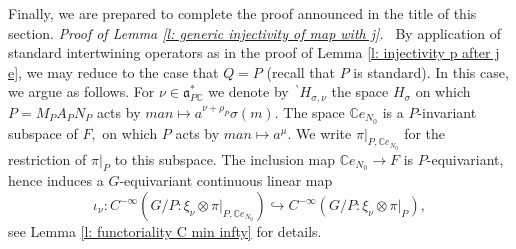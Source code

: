 \documentclass[12pt,a4paper]{article}
\def\medno{\medbreak\noindent}
\def\msy#1{{\mathbb #1}}
\def\C{{\msy C}}
\def\gs{\sigma}
\def\got#1{\mathfrak #1}
\def\fa{{\got a}}
\def\to{\rightarrow}
\def\iC{{\scriptscriptstyle \C}}
\numberwithin{Thm}{section}
\numberwithin{equation}{section}
\def\embeds{\hookrightarrow}
\def\faPdc{{\fa_{P\iC}^*}}
\numberwithin{equation}{section}
\def\bp{\!{\,}^\backprime}
\def\faPdc{\fa_{P\iC}^*}
\begin{document}
Finally, we are prepared to complete the proof announced in the title of this section.
\medno
{\em Proof of Lemma \ref{l: generic injectivity of map with j}.\ }
By application of standard intertwining operators as in the proof of Lemma \ref{l: injectivity p after j e},
 we may reduce to the case that $Q = P$ (recall that $P$ is standard). 
 In this case, we argue as follows. For $\nu \in \faPdc$ we 
 denote by  $\bp H_{\gs, \nu}$ the space $H_\gs$ on which $P=M_P A_PN_P$ acts by 
 $man \mapsto a^{\nu + \rho_P}\gs(m).$ The space $\C e_{N_0}$ is a $P$-invariant subspace of $F,$ 
 on which $P $ acts by $man \mapsto a^\mu.$ We write $\pi|_{P,\C e_{N_0}}$ 
 for the restriction of $\pi|_P$ to this subspace. The inclusion map $\C e_{N_0} \to F$ 
 is $P$-equivariant, hence 
 induces a $G$-equivariant continuous linear map 
$$
\iota_\nu:  C^{-\infty}(G /P: \xi_\nu \otimes \pi|_{P,\C e_{N_0}}) \embeds C^{-\infty}(G /P: 
\xi_\nu \otimes \pi|_P),
 $$
 see Lemma \ref{l: functoriality C min infty} for details.
 
\end{document}
